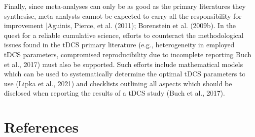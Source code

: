 \documentclass[
  man,floatsintext]{apa6}
\begin{document}
Finally, since meta-analyses can only be as good as the primary literatures they synthesise, meta-analysts cannot be expected to carry all the responsibility for improvement {[}Aguinis, Pierce, et al. (2011); Borenstein et al. (2009b). In the quest for a reliable cumulative science, efforts to counteract the methodological issues found in the tDCS primary literature (e.g., heterogeneity in employed tDCS parameters, compromised reproducibility due to incomplete reporting Buch et al., 2017) must also be supported. Such efforts include mathematical models which can be used to systematically determine the optimal tDCS parameters to use (Lipka et al., 2021) and checklists outlining all aspects which should be disclosed when reporting the results of a tDCS study (Buch et al., 2017).

\newpage

\hypertarget{references}{%
\section{References}\label{references}}

\begingroup
\setlength{\parindent}{-0.5in}
\end{document}
